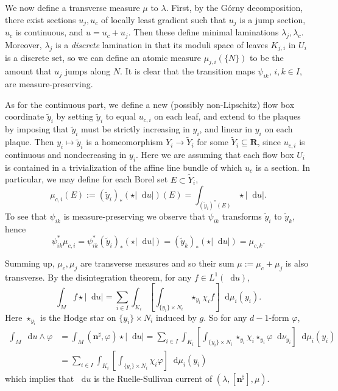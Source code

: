 \documentclass[reqno,10pt]{amsart}
\newcommand{\RR}{\mathbf{R}}
\newcommand*\dif{\mathop{}\!\mathrm{d}}
\newcommand{\normal}{\mathbf n}
\theoremstyle{definition}
\numberwithin{equation}{section}
\begin{document}
We now define a transverse measure $\mu$ to $\lambda$.
First, by the G\'orny decomposition, there exist sections $u_j, u_c$ of locally least gradient such that $u_j$ is a jump section, $u_c$ is continuous, and $u = u_c + u_j$.
Then these define minimal laminations $\lambda_j, \lambda_c$.
Moreover, $\lambda_j$ is a \emph{discrete} lamination in that its moduli space of leaves $K_{j,i}$ in $U_i$ is a discrete set, so we can define an atomic measure $\mu_{j,i}(\{N\})$ to be the amount that $u_j$ jumps along $N$.
It is clear that the transition maps $\psi_{ik}$, $i,k \in I$, are measure-preserving.

As for the continuous part, we define a new (possibly non-Lipschitz) flow box coordinate $\tilde y_i$ by setting $\tilde y_i$ to equal $u_{c,i}$ on each leaf, and extend to the plaques by imposing that $\tilde y_i$ must be strictly increasing in $y_i$, and linear in $y_i$ on each plaque.
Then $y_i \mapsto \tilde y_i$ is a homeomorphism $Y_i \to \tilde Y_i$ for some $\tilde Y_i \subseteq \RR$, since $u_{c,i}$ is continuous and nondecreasing in $y_i$.
Here we are assuming that each flow box $U_i$ is contained in a trivialization of the affine line bundle of which $u_c$ is a section.
In particular, we may define for each Borel set $E \subset \tilde Y_i$,
$$\mu_{c,i}(E) := (\tilde y_i)_*(\star |\dif u|)(E) = \int_{(\tilde y_i)^*(E)} \star |\dif u|.$$
To see that $\psi_{ik}$ is measure-preserving we observe that $\psi_{ik}$ transforms $\tilde y_i$ to $\tilde y_k$, hence
$$\psi_{ik}^* \mu_{c,i} = \psi_{ik}^* (\tilde y_i)_* (\star |\dif u|) = (\tilde y_k)_* (\star |\dif u|) = \mu_{c,k}.$$

Summing up, $\mu_c, \mu_j$ are transverse measures and so their sum $\mu := \mu_c + \mu_j$ is also transverse.
By the disintegration theorem, for any $f \in L^1(\dif u)$,
$$\int_M f \star |\dif u| = \sum_{i \in I} \int_{K_i} \left[\int_{\{y_i\} \times N_i} \star_{y_i} \chi_i f \right] \dif \mu_i(y_i).$$
Here $\star_{y_i}$ is the Hodge star on $\{y_i\} \times N_i$ induced by $g$.
So for any $d-1$-form $\varphi$,
\begin{align*}
\int_M \dif u \wedge \varphi &= \int_M (\normal^\sharp, \varphi) \star |\dif u|
= \sum_{i \in I} \int_{K_i} \left[\int_{\{y_i\} \times N_i} \star_{y_i} \chi_i \star_{y_i} \varphi \dif \nu_{y_i}\right] \dif \mu_i(y_i) \\
&= \sum_{i \in I} \int_{K_i} \left[\int_{\{y_i\} \times N_i} \chi_i \varphi\right] \dif \mu_i(y_i)
\end{align*}
which implies that $\dif u$ is the Ruelle-Sullivan current of $(\lambda, [\normal^\sharp], \mu)$.
\end{document}

